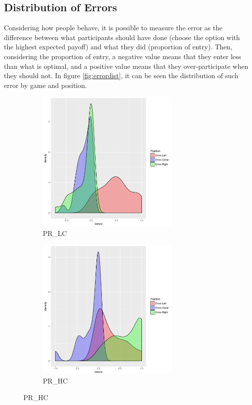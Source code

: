 \subsection{Distribution of Errors}

Considering how people behave, it is possible to measure the error as the difference between what participants should have done (choose the option with the highest expected payoff) and what they did (proportion of entry). Then, considering the proportion of entry, a negative value means that they enter less than what is optimal, and a positive value means that they over-participate when they should not. In figure \ref{fig:errordist}, it can be seen the distribution of such error by game and position.


\begin{figure}[h]
	
	\begin{subfigure}{0.5\textwidth}
		\includegraphics[width=1\linewidth, height=7cm]{../../results/figures/errorDistributionPR_LC} 
		\caption{PR\_LC}
		\label{fig:errdistsubim1}
	\end{subfigure}
	\begin{subfigure}{0.5\textwidth}
		\includegraphics[width=1\linewidth, height=7cm]{../../results/figures/errorDistributionPR_HC}
		\caption{PR\_HC}
		\label{fig:errdistsubim2}
	\end{subfigure}


\end{figure}
